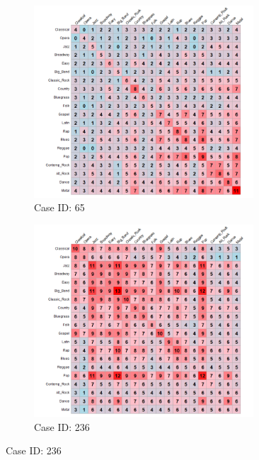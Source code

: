 \documentclass[12pt]{article}
\begin{document}
\begin{figure}[t]
    \captionsetup[subfigure]{font=footnotesize,labelfont=footnotesize}
    \centering
     \begin{subfigure}[b]{0.49\textwidth}
        \includegraphics[trim={1cm 0cm 0cm 0cm},clip, width=0.9\textwidth]{Plots/data-ex-rp1.png}
            \caption{Case ID: 65}
            \label{fig:ind-ex-rp1}
    \end{subfigure}
     \begin{subfigure}[b]{0.49\textwidth}
        \includegraphics[trim={1cm 0cm 0cm 0cm},clip, width=0.9\textwidth]{Plots/data-ex-rp2.png}
            \caption{Case ID: 236}

\end{subfigure}
\end{figure}
\end{document}
